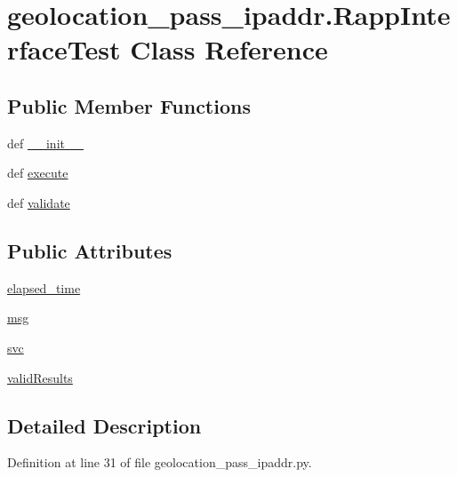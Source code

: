 \hypertarget{classgeolocation__pass__ipaddr_1_1RappInterfaceTest}{\section{geolocation\-\_\-pass\-\_\-ipaddr.\-Rapp\-Interface\-Test Class Reference}
\label{classgeolocation__pass__ipaddr_1_1RappInterfaceTest}
}
\subsection*{Public Member Functions}
\begin{DoxyCompactItemize}
\item 
def \hyperlink{classgeolocation__pass__ipaddr_1_1RappInterfaceTest_a5ef3786109cb738dc756bfab82881a89}{\-\_\-\-\_\-init\-\_\-\-\_\-}
\item 
def \hyperlink{classgeolocation__pass__ipaddr_1_1RappInterfaceTest_ac281f9d0503a787c313a06fc849f7ffe}{execute}
\item 
def \hyperlink{classgeolocation__pass__ipaddr_1_1RappInterfaceTest_a3f87ba70281924bfe19f2096750d59ee}{validate}
\end{DoxyCompactItemize}
\subsection*{Public Attributes}
\begin{DoxyCompactItemize}
\item 
\hyperlink{classgeolocation__pass__ipaddr_1_1RappInterfaceTest_acf55664a02f6b2d6f34746cf4ebe5875}{elapsed\-\_\-time}
\item 
\hyperlink{classgeolocation__pass__ipaddr_1_1RappInterfaceTest_a7b586e5ee5b61525634d8f3f31696d04}{msg}
\item 
\hyperlink{classgeolocation__pass__ipaddr_1_1RappInterfaceTest_a6aae49924d451d3ff22c6c762aa7d731}{svc}
\item 
\hyperlink{classgeolocation__pass__ipaddr_1_1RappInterfaceTest_ad65e3f03b0cef7e2bad147b08705faac}{valid\-Results}
\end{DoxyCompactItemize}


\subsection{Detailed Description}


Definition at line 31 of file geolocation\-\_\-pass\-\_\-ipaddr.\-py.




